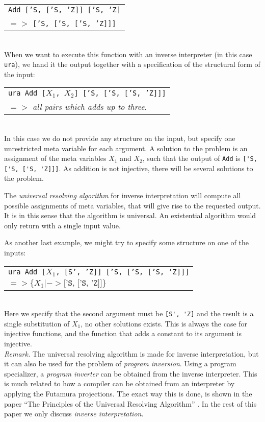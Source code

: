 \documentclass[10pt]{../sigplanconf}
\begin{document}
\begin{tabular}{l}
\texttt{Add ['S, ['S, 'Z]] ['S, 'Z]} \\
\quad $=>$ \texttt{['S, ['S, ['S, 'Z]]]}
\end{tabular}\\

When we want to execute this function with an inverse interpreter (in
this case \texttt{ura}), we hand it the output together with a
specification of the structural form of the input:\\

\begin{tabular}{l}
  \texttt{ura Add [$X_1$, $X_2$] ['S, ['S, ['S, 'Z]]]} \\
   \quad $=>$ \textit{all pairs which adds up to three}.
\end{tabular}\\

In this case we do not provide any structure on the input, but specify
one unrestricted meta variable for each argument. A solution to the
problem is an assignment of the meta variables $X_1$ and $X_2$, such
that the output of \texttt{Add} is \verb|['S, ['S, ['S, 'Z]]]|. As
addition is not injective, there will be several solutions to the
problem.

The \textit{universal resolving algorithm} for inverse interpretation
will compute all possible assignments of meta variables, that will
give rise to the requested output. It is in this sense that the
algorithm is universal. An existential algorithm would only return
with a single input value.

As another last example, we might try to specify some structure on one
of the inputs:\\

\begin{tabular}{l}
  \texttt{ura Add [$X_1$, [S', 'Z]] ['S, ['S, ['S, 'Z]]]} \\
   \quad $=> \{ X_1 |-> \texttt{['S, ['S, 'Z]]} \}$
\end{tabular}\\

Here we specify that the second argument must be \verb|[S', 'Z]| and
the result is a single substitution of $X_1$, no other solutions
exists. This is always the case for injective functions, and the
function that adds a constant to its argument is injective.\\

\textit{Remark.} The universal resolving algorithm is made for inverse
interpretation, but it can also be used for the problem of
\textit{program inversion}. Using a program specializer, a
\textit{program inverter} can be obtained from the inverse
interpreter. This is much related to how a compiler can be obtained
from an interpreter by applying the Futamura projections. The exact
way this is done, is shown in the paper ``The Principles of the
Universal Resolving Algorithm'' \cite{abramov2000universal}. In the
rest of this paper we only discuss \textit{inverse interpretation}.\\
\end{document}
